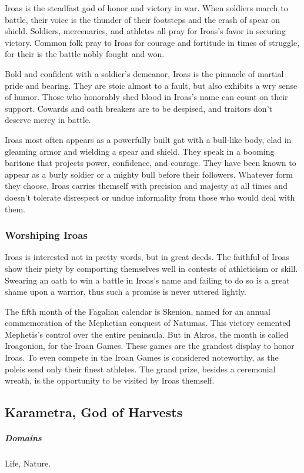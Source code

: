     Iroas is the steadfast god of honor and victory in war.
    When soldiers march to battle, their voice is the thunder of their footsteps and the crash of spear on shield.
    Soldiers, mercenaries, and athletes all pray for Iroas's favor in securing victory.
    Common folk pray to Iroas for courage and fortitude in times of struggle, for their is the battle nobly fought and won.

    Bold and confident with a soldier's demeanor, Iroas is the pinnacle of martial pride and bearing.
    They are stoic almost to a fault, but also exhibits a wry sense of humor.
    Those who honorably shed blood in Iroas's name can count on their support.
    Cowards and oath breakers are to be despised, and traitors don't deserve mercy in battle.

    Iroas most often appears as a powerfully built gat with a bull-like body, clad in gleaming armor and wielding a spear and shield.
    They speak in a booming baritone that projects power, confidence, and courage.
    They have been known to appear as a burly soldier or a mighty bull before their followers.
    Whatever form they choose, Iroas carries themself with precision and majesty at all times and doesn't tolerate disrespect or undue informality from those who would deal with them.

    \subsubsection{Worshiping Iroas}
        Iroas is interested not in pretty words, but in great deeds.
        The faithful of Iroas show their piety by comporting themselves well in contests of athleticism or skill.
        Swearing an oath to win a battle in Iroas's name and failing to do so is a great shame upon a warrior, thus such a promise is never uttered lightly.

        The fifth month of the Fagalian calendar is Skenion, named for an annual commemoration of the Mephetian conquest of Natumas.
        This victory cemented Mephetis's control over the entire peninsula.
        But in Akros, the month is called Iroagonion, for the Iroan Games.
        These games are the grandest display to honor Iroas.
        To even compete in the Iroan Games is considered noteworthy, as the poleis send only their finest athletes.
        The grand prize, besides a ceremonial wreath, is the opportunity to be visited by Iroas themself.

\subsection*{Karametra, God of Harvests} \label{ssec::karametra}
    \subparagraph{Domains} Life, Nature.

